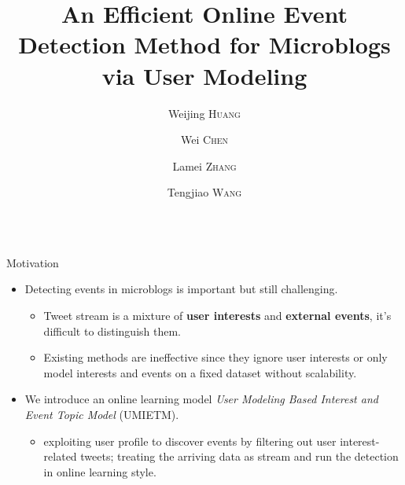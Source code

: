 \documentclass{beamer}
\title{An Efficient Online Event Detection Method for Microblogs via User Modeling}
\author[huangwaleking\string@gmail.com \hspace{.1em} \{pekingchenwei,tjwang\}@pku.edu.cn \hspace{.1em}citlmzhang@163.com]{Weijing \textsc{Huang} \and Wei \textsc{Chen} \and Lamei \textsc{Zhang} \and Tengjiao \textsc{Wang}}
\institute{\raisebox{-.2ex}{EECS, Peking University, Beijing}}
\date{}
\begin{document}
\begin{frame}
\begin{columns}[T]
\begin{column}{.46\textwidth}
\parbox[t][1200mm]{\textwidth}{
\begin{block}{Motivation}
\begin{itemize}
\item Detecting events in microblogs is important but still challenging.
        \begin{itemize}
                \item Tweet stream is a mixture of \textbf{user interests} and \textbf{external events}, it's difficult to distinguish them.
                \item Existing methods are ineffective since they ignore user interests or only model interests and events on a fixed dataset without scalability.
        \end{itemize}
\item We introduce an online learning model \textit{User Modeling Based Interest and Event Topic Model} (UMIETM).
        \begin{itemize}
                \item exploiting user profile to discover events by filtering out user interest-related tweets; treating the arriving data as stream and run the detection in online learning style.
        \end{itemize}
\end{itemize}
\end{block}


}
\end{column}
\end{columns}
\end{frame}
\end{document}
